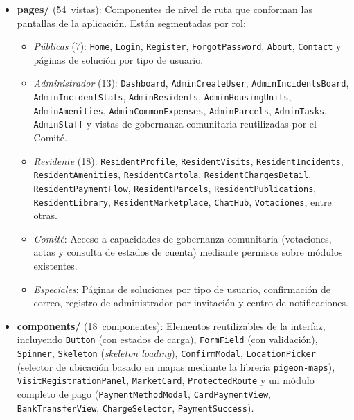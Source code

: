 \begin{itemize}
    \item \textbf{pages/} (54~vistas): Componentes de nivel de ruta que conforman las pantallas de la aplicación. Están segmentadas por rol:
    \begin{itemize}
        \item \textit{Públicas} (7): \texttt{Home}, \texttt{Login}, \texttt{Register}, \texttt{ForgotPassword}, \texttt{About}, \texttt{Contact} y páginas de solución por tipo de usuario.
        \item \textit{Administrador} (13): \texttt{Dashboard}, \texttt{AdminCreateUser}, \texttt{AdminIncidentsBoard}, \texttt{AdminIncidentStats}, \texttt{AdminResidents}, \texttt{AdminHousingUnits}, \texttt{AdminAmenities}, \texttt{AdminCommonExpenses}, \texttt{AdminParcels}, \texttt{AdminTasks}, \texttt{AdminStaff} y vistas de gobernanza comunitaria reutilizadas por el Comité.
        \item \textit{Residente} (18): \texttt{ResidentProfile}, \texttt{ResidentVisits}, \texttt{ResidentIncidents}, \texttt{ResidentAmenities}, \texttt{ResidentCartola}, \texttt{ResidentChargesDetail}, \texttt{ResidentPaymentFlow}, \texttt{ResidentParcels}, \texttt{ResidentPublications}, \texttt{ResidentLibrary}, \texttt{ResidentMarketplace}, \texttt{ChatHub}, \texttt{Votaciones}, entre otras.
        \item \textit{Comité}: Acceso a capacidades de gobernanza comunitaria (votaciones, actas y consulta de estados de cuenta) mediante permisos sobre módulos existentes.
        \item \textit{Especiales}: Páginas de soluciones por tipo de usuario, confirmación de correo, registro de administrador por invitación y centro de notificaciones.
    \end{itemize}

    \item \textbf{components/} (18~componentes): Elementos reutilizables de la interfaz, incluyendo \texttt{Button} (con estados de carga), \texttt{FormField} (con validación), \texttt{Spinner}, \texttt{Skeleton} (\textit{skeleton loading}), \texttt{ConfirmModal}, \texttt{LocationPicker} (selector de ubicación basado en mapas mediante la librería \texttt{pigeon-maps}), \texttt{VisitRegistrationPanel}, \texttt{MarketCard}, \texttt{ProtectedRoute} y un módulo completo de pago (\texttt{PaymentMethodModal}, \texttt{CardPaymentView}, \texttt{BankTransferView}, \texttt{ChargeSelector}, \texttt{PaymentSuccess}).


\end{itemize}
